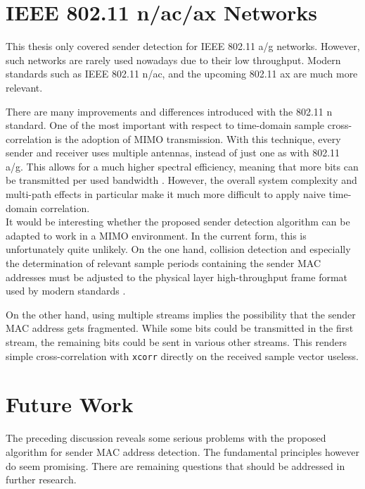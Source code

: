
\section{IEEE 802.11 n/ac/ax Networks}\label{sec:mimo}

This thesis only covered sender detection for IEEE 802.11 a/g networks. However, such networks are rarely used nowadays due to their low throughput. Modern standards such as IEEE 802.11 n/ac, and the upcoming 802.11 ax are much more relevant.

There are many improvements and differences introduced with the 802.11 n standard. One of the most important with respect to time-domain sample cross-correlation is the adoption of \gls{MIMO} transmission. With this technique, every sender and receiver uses multiple antennas, instead of just one as with 802.11 a/g. This allows for a much higher spectral efficiency, meaning that more bits can be transmitted per used bandwidth \cite{ieee2012}. However, the overall system complexity and multi-path effects in particular make it much more difficult to apply naive time-domain correlation.\\

It would be interesting whether the proposed sender detection algorithm can be adapted to work in a \gls{MIMO} environment. In the current form, this is unfortunately quite unlikely. On the one hand, collision detection and especially the determination of relevant sample periods containing the sender \gls{MAC} addresses must be adjusted to the physical layer high-throughput frame format used by modern standards \cite{ieee2012}.

On the other hand, using multiple streams implies the possibility that the sender \gls{MAC} address gets fragmented. While some bits could be transmitted in the first stream, the remaining bits could be sent in various other streams. This renders simple cross-correlation with \texttt{xcorr} directly on the received sample vector useless.



\section{Future Work}

The preceding discussion reveals some serious problems with the proposed algorithm for sender \gls{MAC} address detection. The fundamental principles however do seem promising. There are remaining questions that should be addressed in further research.\\


